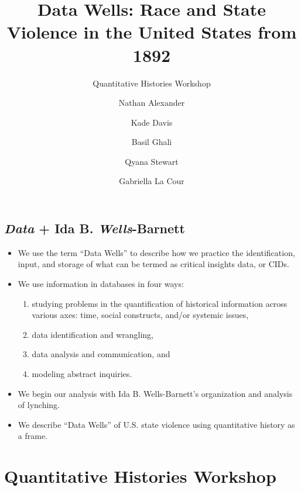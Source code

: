 \documentclass[
  letterpaper,
  DIV=11,
  numbers=noendperiod]{scrartcl}
\title{Data Wells: Race and State Violence in the United States from
1892}
\subtitle{Quantitative Histories Workshop}
\author{Nathan Alexander \and Kade Davis \and Basil Ghali \and Qyana
Stewart \and Gabriella La Cour}
\date{}
\renewcommand*\contentsname{Table of contents}
\newcommand\contentsname{Table of contents}
\begin{document}
\maketitle
\ifdefined\Shaded\renewenvironment{Shaded}{\begin{tcolorbox}[sharp corners, boxrule=0pt, frame hidden, interior hidden, breakable, enhanced, borderline west={3pt}{0pt}{shadecolor}]}{\end{tcolorbox}}\fi

\renewcommand*\contentsname{Table of contents}
{
\hypersetup{linkcolor=}
\setcounter{tocdepth}{3}
\tableofcontents
}
\hypertarget{data-ida-b.-wells-barnett}{%
\subsection{\texorpdfstring{{\emph{Data}} + Ida B.
{\emph{Wells}}-Barnett}{Data + Ida B. Wells-Barnett}}\label{data-ida-b.-wells-barnett}}

\begin{itemize}
\item
  We use the term ``{Data Wells}'' to describe how we practice the
  identification, input, and storage of what can be termed as critical
  insights data, or CIDs.
\item
  We use information in databases in four ways:

  \begin{enumerate}
  \def\labelenumi{(\arabic{enumi})}
  \item
    studying problems in the {quantification of historical information}
    across various axes: time, social constructs, and/or systemic
    issues,
  \item
    data {identification} and {wrangling},
  \item
    data {analysis} and {communication}, and
  \item
    {modeling} abstract inquiries.
  \end{enumerate}
\item
  We begin our analysis with Ida B. Wells-Barnett's organization and
  analysis of lynching.
\item
  We describe ``Data Wells'' of U.S. state violence using quantitative
  history as a frame.
\end{itemize}

\hypertarget{quantitative-histories-workshop}{%
\section{Quantitative Histories
Workshop}\label{quantitative-histories-workshop}}
\end{document}
